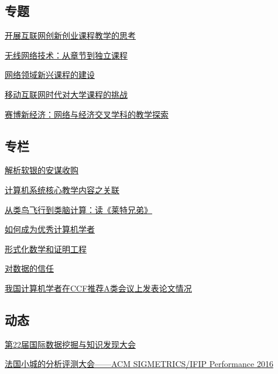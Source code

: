 \documentclass[a4paper]{article}
\begin{document}
\subsection{专题}
\href{http://history.ccf.org.cn/resources/1190201776262/2016/09/12/cuiyong.pdf}{开展互联网创新创业课程教学的思考}

\href{http://history.ccf.org.cn/resources/1190201776262/2016/09/12/jinguang.pdf}{无线网络技术：从章节到独立课程}

\href{http://history.ccf.org.cn/resources/1190201776262/2016/09/12/wangxinbing1.pdf}{网络领域新兴课程的建设}

\href{http://history.ccf.org.cn/resources/1190201776262/2016/09/12/wangxinbing2.pdf}{移动互联网时代对大学课程的挑战}

\href{http://history.ccf.org.cn/resources/1190201776262/2016/09/12/xuke.pdf}{赛博新经济：网络与经济交叉学科的教学探索}

\subsection{专栏}
\href{http://history.ccf.org.cn/resources/1190201776262/2016/09/12/wanyun.pdf}{解析软银的安谋收购}

\href{http://history.ccf.org.cn/resources/1190201776262/2016/09/12/yuanchunfeng.pdf}{计算机系统核心教学内容之关联}

\href{http://history.ccf.org.cn/resources/1190201776262/2016/09/12/zhangzheng.pdf}{从类鸟飞行到类脑计算：读《莱特兄弟》}

\href{http://history.ccf.org.cn/resources/1190201776262/2016/09/12/gaowen.pdf}{如何成为优秀计算机学者}

\href{http://history.ccf.org.cn/resources/1190201776262/2016/09/12/chengang.pdf}{形式化数学和证明工程}

\href{http://history.ccf.org.cn/resources/1190201776262/2016/09/12/david.pdf}{对数据的信任}

\href{http://history.ccf.org.cn/resources/1190201776262/2016/09/12/maobo.pdf}{我国计算机学者在CCF推荐A类会议上发表论文情况}

\subsection{动态}
\href{http://history.ccf.org.cn/resources/1190201776262/2016/09/12/tangjie.pdf}{第22届国际数据挖掘与知识发现大会}

\href{http://history.ccf.org.cn/resources/1190201776262/2016/09/12/huanglongbo.pdf}{法国小城的分析评测大会——ACM SIGMETRICS/IFIP Performance 2016}
\end{document}

